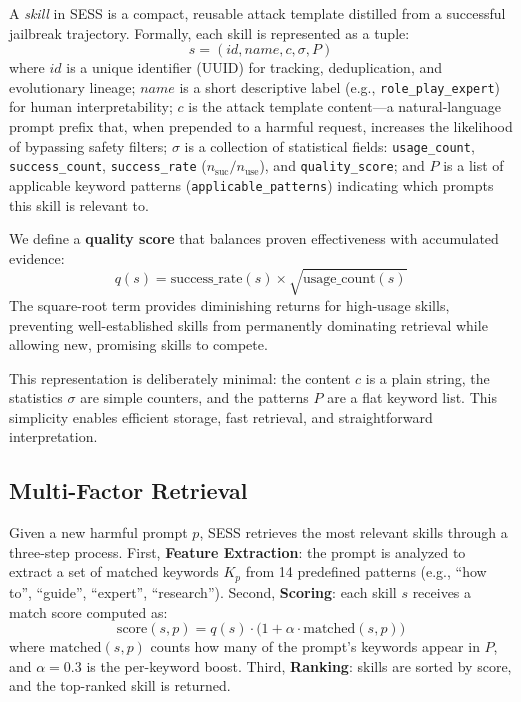 \documentclass[letterpaper]{article}
\begin{document}
A \textit{skill} in SESS is a compact, reusable attack template distilled from a successful jailbreak trajectory. Formally, each skill is represented as a tuple:
\begin{equation}
s = (id, name, c, \sigma, P)
\end{equation}
where $id$ is a unique identifier (UUID) for tracking, deduplication, and evolutionary lineage; $name$ is a short descriptive label (e.g., \texttt{role\_play\_expert}) for human interpretability; $c$ is the attack template content---a natural-language prompt prefix that, when prepended to a harmful request, increases the likelihood of bypassing safety filters; $\sigma$ is a collection of statistical fields: \texttt{usage\_count}, \texttt{success\_count}, \texttt{success\_rate} ($n_{\text{suc}} / n_{\text{use}}$), and \texttt{quality\_score}; and $P$ is a list of applicable keyword patterns (\texttt{applicable\_patterns}) indicating which prompts this skill is relevant to.

We define a \textbf{quality score} that balances proven effectiveness with accumulated evidence:
\begin{equation}
q(s) = \text{success\_rate}(s) \times \sqrt{\text{usage\_count}(s)}
\end{equation}
The square-root term provides diminishing returns for high-usage skills, preventing well-established skills from permanently dominating retrieval while allowing new, promising skills to compete.

This representation is deliberately minimal: the content $c$ is a plain string, the statistics $\sigma$ are simple counters, and the patterns $P$ are a flat keyword list. This simplicity enables efficient storage, fast retrieval, and straightforward interpretation.

\subsection{Multi-Factor Retrieval}

Given a new harmful prompt $p$, SESS retrieves the most relevant skills through a three-step process. First, \textbf{Feature Extraction}: the prompt is analyzed to extract a set of matched keywords $K_p$ from 14 predefined patterns (e.g., ``how to'', ``guide'', ``expert'', ``research''). Second, \textbf{Scoring}: each skill $s$ receives a match score computed as:
\begin{equation}
\text{score}(s, p) = q(s) \cdot \bigl(1 + \alpha \cdot \text{matched}(s, p)\bigr)
\end{equation}
where $\text{matched}(s, p)$ counts how many of the prompt's keywords appear in $P$, and $\alpha = 0.3$ is the per-keyword boost. Third, \textbf{Ranking}: skills are sorted by score, and the top-ranked skill is returned.
\end{document}

